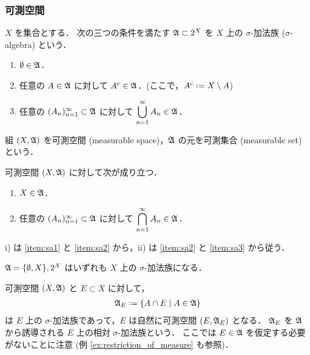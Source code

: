 \subsubsection{可測空間}\label{sec:measurable_space}

\begin{definition}
    $X$ を集合とする．
    次の三つの条件を満たす $\mathfrak{A}\subset2^X$ を $X$ 上の $\sigma$-加法族 ($\sigma$-algebra) という．
    \begin{enumerate}[label=\textsf{(SA\arabic*)},align=left]
        \item\label{item:sa1} $\emptyset\in\mathfrak{A}$．
        \item\label{item:sa2} 任意の $A\in\mathfrak{A}$ に対して $A^{\mathrm{c}}\in\mathfrak{A}$．\quad (ここで，$A^\crm\defeq X\setminus A$)
        \item\label{item:sa3} 任意の $(A_n)_{n=1}^\infty\subset\mathfrak{A}$ に対して $\displaystyle\bigcup_{n=1}^\infty A_n\in\mathfrak{A}$．
    \end{enumerate}
    組 $(X,\mathfrak{A})$ を可測空間 (measurable space)，$\mathfrak{A}$ の元を可測集合 (measurable set) という．
\end{definition}

\begin{remark}\label{rem:measurable_space_other_axioms}
    可測空間 $(X,\mathfrak{A})$ に対して次が成り立つ．
    \begin{enumerate}
        \item $X\in\mathfrak{A}$．
        \item 任意の $(A_n)_{n=1}^\infty\subset\mathfrak{A}$ に対して $\displaystyle\bigcap_{n=1}^\infty A_n\in\mathfrak{A}$．
    \end{enumerate}
    \textrm{i)} は \ref{item:sa1} と \ref{item:sa2} から，\textrm{ii)} は \ref{item:sa2} と \ref{item:sa3} から従う．
\end{remark}

\begin{example}
    $\mathfrak{A}=\{\emptyset,X\},2^X$ はいずれも $X$ 上の $\sigma$-加法族になる．
\end{example}

\begin{example}\label{ex:relative_sigma_algebra}
    可測空間 $(X,\mathfrak{A})$ と $E\subset X$ に対して，
    \begin{align*}
        \Afrak_E\defeq\{A\cap E\mid A\in\Afrak\}
    \end{align*}
    は $E$ 上の $\sigma$-加法族であって，$E$ は自然に可測空間 $(E,\mathfrak{A}_E)$ となる．
    $\mathfrak{A}_E$ を $\mathfrak{A}$ から誘導される $E$ 上の相対 $\sigma$-加法族という．
    ここでは $E\in\mathfrak{A}$ を仮定する必要がないことに注意 (例 \ref{ex:restriction_of_measure} も参照)．
\end{example}

